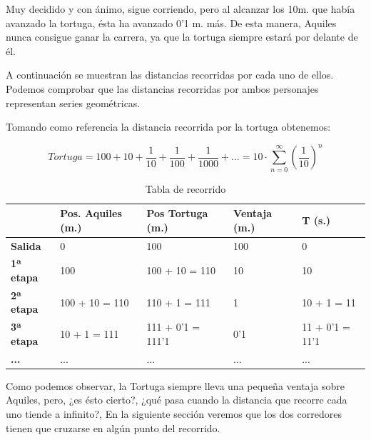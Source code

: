 \documentclass[a4paper,12pt]{article}
\begin{document}
   Muy decidido y con ánimo, sigue corriendo, pero al alcanzar los 10m.
   que había avanzado la tortuga, ésta ha avanzado 0'1 m. más.  
   De esta manera, Aquiles nunca consigue ganar la carrera, ya que la tortuga
   siempre estará por delante de él. 
   
   A continuación se muestran las distancias recorridas por cada uno de ellos. Podemos
   comprobar que las distancias recorridas por ambos personajes representan
   series geométricas.
   
   Tomando como referencia la distancia recorrida por la tortuga obtenemos:
   
   \begin{equation}
   Tortuga = 100 + 10 + \frac{1}{10} + \frac{1}{100} + \frac{1}{1000} + ... = 10 \cdot \sum_{n=0}^\infty (\frac{1}{10})^n
   \end{equation}

   \begin{table}[h]
   \begin{center}
   \begin{tabular}{|l|l|l|l|l|}
   \hline
                     & \textbf{Pos. Aquiles (m.)} &  \textbf{Pos Tortuga (m.)}  & \textbf{Ventaja (m.)} & \textbf{T (s.)} \\ \hline
   \textbf{Salida}   & 0                          &  100                        & 100                   & 0                \\ \hline
   \textbf{1ª etapa} & 100                        &  100 + 10 = 110             & 10                    & 10               \\ \hline
   \textbf{2ª etapa} & 100 + 10 = 110             &  110 + 1 = 111              & 1                     & 10 + 1 = 11      \\ \hline 
   \textbf{3ª etapa} & 10 + 1 = 111               &  111 + 0'1 = 111'1          & 0'1                   & 11 + 0'1 = 11'1  \\ \hline 
   \textbf{...}      & ...                        &  ...                        & ...                   & ...              \\ \hline 
 
   \end{tabular}
   \end{center}
   \caption{Tabla de recorrido}
   \label{tab:ejemplo}
   \end{table} 

   Como podemos observar, la Tortuga siempre lleva una pequeña ventaja sobre Aquiles, pero, ¿es ésto cierto?,
   ¿qué pasa cuando la distancia que recorre cada uno tiende a infinito?, 
   En la siguiente sección veremos que los dos corredores tienen que cruzarse en algún punto del recorrido.
   
\end{document}
